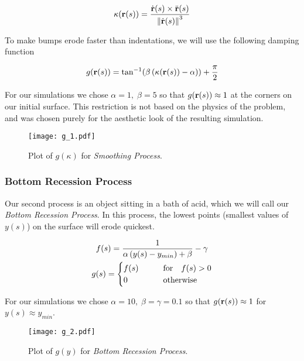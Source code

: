 \[
  \kappa(\bvec{r}(s)) = \frac{\dot{\bvec{r}}(s) \times \ddot{\bvec{r}}(s)}{\norm{\dot{\bvec{r}}(s)}^3}
\]

To make bumps erode faster than indentations, we will use the following damping function

\begin{equation}
  g(\mathbf{r}(s)) = \tan^{-1}(\beta \, (\kappa(\mathbf{r}(s)) - \alpha)) + \frac{\pi}{2}
\end{equation}

For our simulations we chose $\alpha = 1, \; \beta = 5$ so that $g(\mathbf{r}(s)) \approx 1$ at the corners on our initial surface. This restriction is not based on the physics of the problem, and was chosen purely for the aesthetic look of the resulting simulation.

\begin{figure}[H]
    \begin{center}
      \texttt{[image: g\_1.pdf]}
    \end{center}
  \vspace{-.2in} %
  \caption{\label{fig:g-1} Plot of $g(\kappa)$ for \textit{Smoothing Process}.}
\end{figure}

\subsubsection*{Bottom Recession Process}

Our second process is an object sitting in a bath of acid, which we will call our \textit{Bottom Recession Process}. In this process, the lowest points (smallest values of $y(s)$) on the surface will erode quickest.

\begin{gather}
  f(s) = \frac{1}{\alpha \, (y(s) - y_{min}) + \beta} - \gamma \notag\\
  g(s) = \begin{cases}
    f(s) \qquad &\text{for} \quad f(s) > 0\\
    0 \qquad &\text{otherwise}
  \end{cases}
\end{gather}

For our simulations we chose $\alpha = 10, \; \beta = \gamma = 0.1$ so that $g(\mathbf{r}(s)) \approx 1$ for $y(s) \approx y_{min}$.

\begin{figure}[H]
    \begin{center}
      \texttt{[image: g\_2.pdf]}
    \end{center}
  \vspace{-.2in} %
  \caption{\label{fig:g-2} Plot of $g(y)$ for \textit{Bottom Recession Process}.}
\end{figure}


